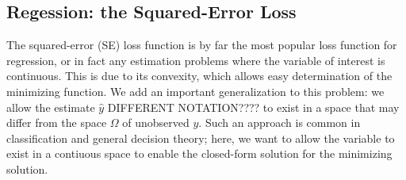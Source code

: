 \documentclass[12pt]{article}
\begin{document}
\subsection{Regession: the Squared-Error Loss}

The squared-error (SE) loss function is by far the most popular loss function for regression, or in fact any estimation problems where the variable of interest is continuous. This is due to its convexity, which allows easy determination of the minimizing function. We add an important generalization to this problem: we allow the estimate $\hat{y}$ DIFFERENT NOTATION???? to exist in a space that may differ from the space $\Omega$ of unobserved $y$. Such an approach is common in classification and general decision theory; here, we want to allow the variable to exist in a contiuous space to enable the closed-form solution for the minimizing solution.




\end{document}
